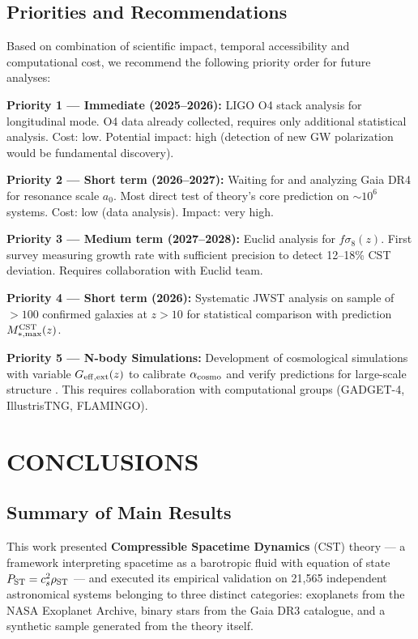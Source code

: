 \documentclass[11pt,a4paper]{article}
\begin{document}
\hypertarget{priorities-and-recommendations}{%
\subsection{Priorities and
Recommendations}\label{priorities-and-recommendations}}

Based on combination of scientific impact, temporal accessibility and
computational cost, we recommend the following priority order for future
analyses:

\textbf{Priority 1 --- Immediate (2025--2026):} LIGO O4 stack analysis
for longitudinal mode. O4 data already collected, requires only
additional statistical analysis. Cost: low. Potential impact: high
(detection of new GW polarization would be fundamental discovery).

\textbf{Priority 2 --- Short term (2026--2027):} Waiting for and
analyzing Gaia DR4 for resonance scale \(a_0\). Most direct test of
theory's core prediction on \(\sim 10^6\) systems. Cost: low (data
analysis). Impact: very high.

\textbf{Priority 3 --- Medium term (2027--2028):} Euclid analysis for
\(f\sigma_8(z)\). First survey measuring growth rate with sufficient
precision to detect 12--18\% CST deviation. Requires collaboration with
Euclid team.

\textbf{Priority 4 --- Short term (2026):} Systematic JWST analysis on
sample of \(> 100\) confirmed galaxies at \(z > 10\) for statistical
comparison with prediction \(M_{*,\rm max}^{\rm CST}(z)\).

\textbf{Priority 5 --- N-body Simulations:} Development of cosmological
simulations with variable \(G_{\rm eff,ext}(z)\) to calibrate
\(\alpha_{\rm cosmo}\) and verify predictions for large-scale structure \cite{Weinberg2008}.
This requires collaboration with computational groups (GADGET-4,
IllustrisTNG, FLAMINGO).

\hypertarget{conclusions}{%
\section{CONCLUSIONS}\label{conclusions}}

\hypertarget{summary-of-main-results}{%
\subsection{Summary of Main
Results}\label{summary-of-main-results}}

This work presented \textbf{Compressible Spacetime Dynamics} (CST)
theory --- a framework interpreting spacetime as a barotropic fluid with
equation of state \(P_{\rm ST} = c_s^2 \rho_{\rm ST}\) --- and executed
its empirical validation on 21,565 independent astronomical systems
belonging to three distinct categories: exoplanets from the NASA
Exoplanet Archive, binary stars from the Gaia DR3 catalogue, and a
synthetic sample generated from the theory itself.
\end{document}
